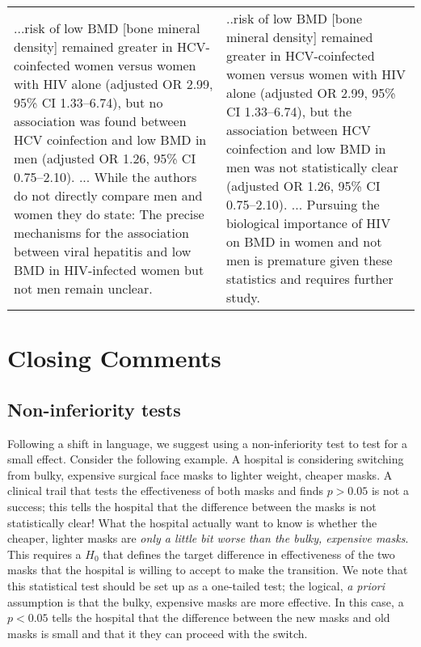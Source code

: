 \begin{tabular}{p{7.0cm}p{7.0cm}}
...risk of low BMD [bone mineral density] remained greater in HCV-coinfected women versus women with HIV alone
(adjusted OR 2.99, 95\% CI 1.33–6.74), but no association was found between HCV coinfection and low BMD in men 
(adjusted OR 1.26, 95\% CI 0.75–2.10). ... While the authors do not directly compare men and women they do state: 
The precise mechanisms for the association between viral hepatitis and low BMD in HIV-infected women but not men 
remain unclear.
& 
..risk of low BMD [bone mineral density] remained greater in HCV-coinfected women versus women with HIV alone
(adjusted OR 2.99, 95\% CI 1.33–6.74), but the association between HCV coinfection and low BMD in men was not
statistically clear (adjusted OR 1.26, 95\% CI 0.75–2.10). ... Pursuing the biological importance of HIV on BMD in 
women and not men is premature given these statistics and requires further study.
\\
\end{tabular}

\section*{Closing Comments}

\subsection*{Non-inferiority tests}

Following a shift in language, we suggest using a non-inferiority test to test for a small effect.
Consider the following 
example.
A hospital is considering switching from bulky, expensive surgical face masks to lighter weight, cheaper masks.
A
clinical trail that tests the effectiveness of both masks and finds $p > 0.05$ is not a success; this tells the hospital 
that the difference between the masks is not statistically clear! What the hospital actually want to know is whether the 
cheaper, lighter masks are \emph{only a little bit worse than the bulky, expensive masks}.
This requires a $H_{0}$ that 
defines the target difference in effectiveness of the two masks that the hospital is willing to accept to make the 
transition.
We note that this statistical test should be set up as a one-tailed test; the logical, \emph{a priori} 
assumption is that the bulky, expensive masks are more effective.
In this case, a $p < 0.05$ tells the hospital that the 
difference between the new masks and old masks is small and that it they can proceed with the switch.

